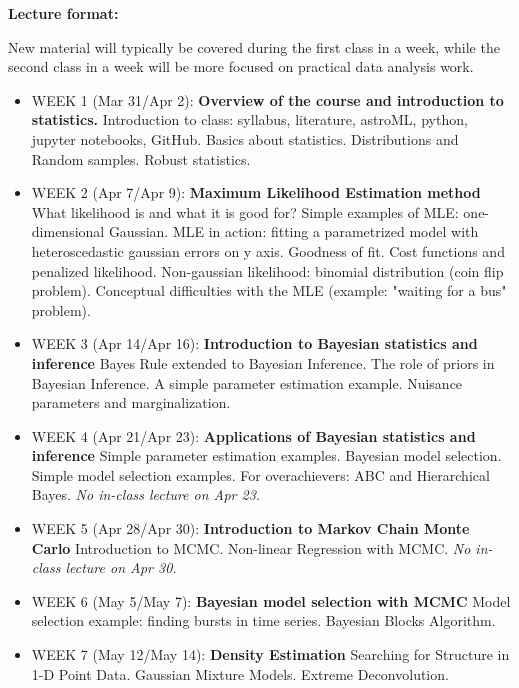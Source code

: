 \documentclass[10pt]{article}
\begin{document}
{\bf Lecture format:}

New material will typically be covered during the first class in a week, while
the second class in a week will be more focused on practical data analysis work. 

\newpage 
\begin{itemize}
\item WEEK 1 (Mar 31/Apr 2): {\bf Overview of the course and
    introduction to statistics.} 
      Introduction to class: syllabus, literature, astroML, python,
      jupyter notebooks, GitHub. 
   Basics about statistics.
   Distributions and Random samples.
   Robust statistics.

\item WEEK 2 (Apr 7/Apr 9): {\bf Maximum Likelihood Estimation method}
What likelihood is and what it is good for?
Simple examples of MLE: one-dimensional Gaussian.
MLE in action: fitting a parametrized model with heteroscedastic gaussian errors on y axis.
Goodness of fit.
Cost functions and penalized likelihood.
Non-gaussian likelihood: binomial distribution (coin flip problem).
Conceptual difficulties with the MLE (example: "waiting for a bus" problem).
 
\item WEEK 3 (Apr 14/Apr 16): {\bf Introduction to Bayesian statistics and inference}
Bayes Rule extended to Bayesian Inference.
The role of priors in Bayesian Inference.
A simple parameter estimation example.
Nuisance parameters and marginalization.


\item WEEK 4 (Apr 21/Apr 23): {\bf Applications of Bayesian statistics and inference}
Simple parameter estimation examples.
Bayesian model selection.
Simple model selection examples.
For overachievers: ABC and Hierarchical Bayes. {\it No in-class lecture on Apr 23.}

\item WEEK 5 (Apr 28/Apr 30): {\bf Introduction to Markov Chain Monte Carlo}
   Introduction to MCMC.
   Non-linear Regression with MCMC. {\it No in-class lecture on Apr 30.}

\item WEEK 6 (May 5/May 7): {\bf Bayesian model selection with MCMC}
  Model selection example: finding bursts in time series.
Bayesian Blocks Algorithm.


\item WEEK 7 (May 12/May 14): {\bf Density Estimation}
  Searching for Structure in 1-D Point Data.
Gaussian Mixture Models.
Extreme Deconvolution.


\end{itemize}
\end{document}

